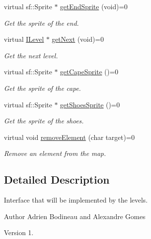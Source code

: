 \begin{DoxyCompactItemize}
virtual sf\-::\-Sprite $\ast$ \hyperlink{class_i_level_a458fa2042948a69f5ec6951e77f9459e}{get\-End\-Sprite} (void)=0
\begin{DoxyCompactList}\small\item\em Get the sprite of the end. \end{DoxyCompactList}\item 
virtual \hyperlink{class_i_level}{I\-Level} $\ast$ \hyperlink{class_i_level_a78b187489e43f061cbd990d9ae957178}{get\-Next} (void)=0
\begin{DoxyCompactList}\small\item\em Get the next level. \end{DoxyCompactList}\item 
virtual sf\-::\-Sprite $\ast$ \hyperlink{class_i_level_a63d5e1443bff759199d0eb60b0f1eb1f}{get\-Cape\-Sprite} ()=0
\begin{DoxyCompactList}\small\item\em Get the sprite of the cape. \end{DoxyCompactList}\item 
virtual sf\-::\-Sprite $\ast$ \hyperlink{class_i_level_ac418e1773d0df3be6ddd40091f04689f}{get\-Shoes\-Sprite} ()=0
\begin{DoxyCompactList}\small\item\em Get the sprite of the shoes. \end{DoxyCompactList}\item 
virtual void \hyperlink{class_i_level_a185d4dd983c714a10a2bbdaebae202e6}{remove\-Element} (char target)=0
\begin{DoxyCompactList}\small\item\em Remove an element from the map. \end{DoxyCompactList}\end{DoxyCompactItemize}


\subsection{Detailed Description}
Interface that will be implemented by the levels. 

\begin{DoxyAuthor}{Author}
Adrien Bodineau and Alexandre Gomes 
\end{DoxyAuthor}
\begin{DoxyVersion}{Version}
1. 
\end{DoxyVersion}


